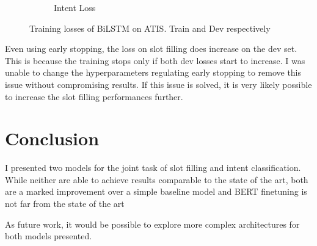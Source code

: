 \documentclass[a4paper]{article}
\begin{document}
\begin{figure}[h!]
\begin{subfigure}[b]{0.22\textwidth}
				\caption{Intent Loss}
	\end{subfigure}
 \caption{Training losses of BiLSTM on ATIS. \textcolor{Myblue}{Train} and \textcolor{Myorange}{Dev} respectively}
 \label{fig:losses}
\end{figure}

Even using early stopping, the loss on slot filling does increase on the dev set. This is because the training stops only if both dev losses start to increase. I was unable to change the hyperparameters regulating early stopping to remove this issue without compromising results. If this issue is solved, it is very likely possible to increase the slot filling performances further.
\section{Conclusion}

I presented two models for the joint task of slot filling and intent classification. While neither are able to achieve results comparable to the state of the art, both are a marked improvement over a simple baseline model and BERT finetuning is not far from the state of the art

As future work, it would be possible to explore more complex architectures for both models presented. 




%
%
\end{document}
